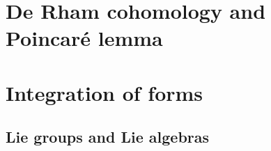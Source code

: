 \documentclass[nobib, a4paper]{tufte-book}
\theoremstyle{plain}
\theoremstyle{definition}
\theoremstyle{remark}
\newcommand{\Q}{\mathbb{Q}}
\newcommand{\R}{\mathbb{R}}
\begin{document}
\chapter{De Rham cohomology and Poincar\'e lemma}


\chapter{Integration of forms}


\begin{appendices}
	\chapter{Lie groups and Lie algebras}\label{appendix:Lie}
	

	
\end{appendices}




\printbibliography
{}
\cleardoublepage
\printindex
\end{document}
